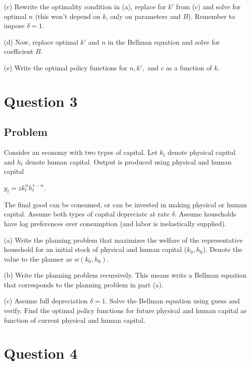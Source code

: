 \documentclass[10pt, a4paper]{article}
\begin{document}
\begin{center}
    (c) Rewrite the optimality condition in (a), replace for $k'$ from (c) and solve for optimal $n$ (this won't depend on $k$, only on parameters and $B$). Remember to impose $\delta=1$.

    (d) Now, replace optimal $k'$ and $n$ in the Bellman equation and solve for coefficient $B$.

    (e) Write the optimal policy functions for $n,k',$ and $c$ as a function of $k$.
\section{Question 3}
  \subsection{Problem}
    Consider an economy with two types of capital. Let $k_t$ denote physical capital and $h_t$ denote human capital. Output is produced using physical and human capital
    \begin{center}
      $y_t=zk_t^{\alpha}h_t^{1-\alpha}$.
    \end{center}
    The final good can be consumed, or can be invested in making physical or human capital. Assume both types of capital depreciate at rate $\delta$. Assume households have log preferences over consumption (and labor is inelastically supplied).

    (a) Write the planning problem that maximizes the welfare of the representative household for an initial stock of physical and human capital ($k_0,h_0$). Denote the value to the planner as $w(k_0,h_0)$.

    (b) Write the planning problem recursively. This means write a Bellman equation that corresponds to the planning problem in part (a).

    (c) Assume full depreciation $\delta=1$. Solve the Bellman equation using guess and verify. Find the optimal policy functions for future physical and human capital as function of current physical and human capital.
\section{Question 4}

\end{center}
\end{document}
